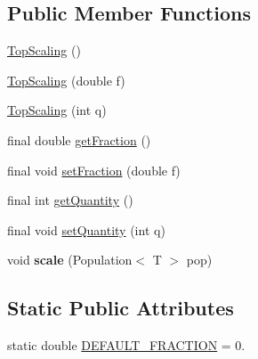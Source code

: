 \subsection*{Public Member Functions}
\begin{DoxyCompactItemize}
\item 
\hyperlink{classjenes_1_1stage_1_1operator_1_1common_1_1_top_scaling_3_01_t_01extends_01_chromosome_01_4_aa1be76204f86d57efff77e708cbcf2f9}{Top\-Scaling} ()
\item 
\hyperlink{classjenes_1_1stage_1_1operator_1_1common_1_1_top_scaling_3_01_t_01extends_01_chromosome_01_4_acb9c77ba5c63f60dcb5d27cf256c6d61}{Top\-Scaling} (double f)
\item 
\hyperlink{classjenes_1_1stage_1_1operator_1_1common_1_1_top_scaling_3_01_t_01extends_01_chromosome_01_4_adb3a002d09932e82a52f848cd4b8247e}{Top\-Scaling} (int q)
\item 
final double \hyperlink{classjenes_1_1stage_1_1operator_1_1common_1_1_top_scaling_3_01_t_01extends_01_chromosome_01_4_a4cb1be9e4948570a5f5d94ed97eb6cba}{get\-Fraction} ()
\item 
final void \hyperlink{classjenes_1_1stage_1_1operator_1_1common_1_1_top_scaling_3_01_t_01extends_01_chromosome_01_4_ab39c283ff0bb662ac76df11474ef133f}{set\-Fraction} (double f)
\item 
final int \hyperlink{classjenes_1_1stage_1_1operator_1_1common_1_1_top_scaling_3_01_t_01extends_01_chromosome_01_4_a165fa24c31055aecd832e837419bad6f}{get\-Quantity} ()
\item 
final void \hyperlink{classjenes_1_1stage_1_1operator_1_1common_1_1_top_scaling_3_01_t_01extends_01_chromosome_01_4_a53e27151e7c9b0b98e5c80e5018d2800}{set\-Quantity} (int q)
\item 
\hypertarget{classjenes_1_1stage_1_1operator_1_1common_1_1_top_scaling_3_01_t_01extends_01_chromosome_01_4_afb5fd14e2cdb722a139193172c56ceaa}{void {\bfseries scale} (Population$<$ T $>$ pop)}\label{classjenes_1_1stage_1_1operator_1_1common_1_1_top_scaling_3_01_t_01extends_01_chromosome_01_4_afb5fd14e2cdb722a139193172c56ceaa}

\end{DoxyCompactItemize}
\subsection*{Static Public Attributes}
\begin{DoxyCompactItemize}
\item 
static double \hyperlink{classjenes_1_1stage_1_1operator_1_1common_1_1_top_scaling_3_01_t_01extends_01_chromosome_01_4_af21f9346a23ebaab4d7a5bd4367edafe}{D\-E\-F\-A\-U\-L\-T\-\_\-\-F\-R\-A\-C\-T\-I\-O\-N} = 0.
\end{DoxyCompactItemize}


